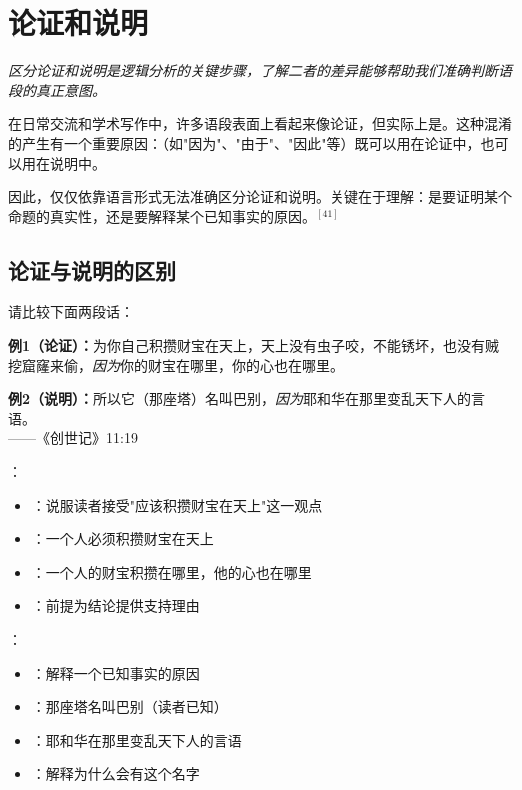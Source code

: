 \section{论证和说明}

\begin{logicbox}[title=引言]
\textit{区分论证和说明是逻辑分析的关键步骤，了解二者的差异能够帮助我们准确判断语段的真正意图。}
\end{logicbox}

在日常交流和学术写作中，许多语段表面上看起来像论证，但实际上是。这种混淆的产生有一个重要原因：（如"因为"、"由于"、"因此"等）既可以用在论证中，也可以用在说明中。

因此，仅仅依靠语言形式无法准确区分论证和说明。关键在于理解：是要证明某个命题的真实性，还是要解释某个已知事实的原因。$^{[41]}$

\subsection{论证与说明的区别}

请比较下面两段话：

\begin{examplebox}[title=论证与说明的对比]
\textbf{例1（论证）：}为你自己积攒财宝在天上，天上没有虫子咬，不能锈坏，也没有贼挖窟窿来偷，\textit{因为}你的财宝在哪里，你的心也在哪里。

\textbf{例2（说明）：}所以它（那座塔）名叫巴别，\textit{因为}耶和华在那里变乱天下人的言语。\\
——《创世记》11:19
\end{examplebox}

\begin{theorembox}[title=论证与说明的核心区别]
：
\begin{itemize}
  \item {}：说服读者接受"应该积攒财宝在天上"这一观点
  \item {}：一个人必须积攒财宝在天上
  \item {}：一个人的财宝积攒在哪里，他的心也在哪里
  \item {}：前提为结论提供支持理由
\end{itemize}

：
\begin{itemize}
  \item {}：解释一个已知事实的原因
  \item {}：那座塔名叫巴别（读者已知）
  \item {}：耶和华在那里变乱天下人的言语
  \item {}：解释为什么会有这个名字
\end{itemize}
\end{theorembox}

